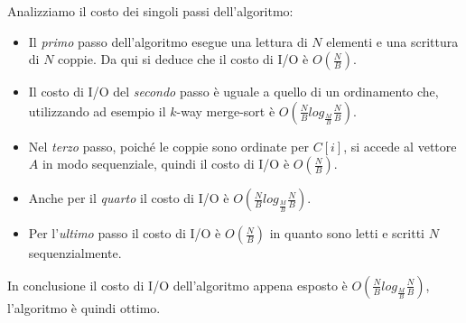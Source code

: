 Analizziamo il costo dei singoli passi dell'algoritmo:
\begin{itemize}
    \item Il \emph{primo} passo dell'algoritmo esegue una lettura di \(N\) elementi
    e una scrittura di \(N\) coppie. Da qui si deduce che il costo di I/O è
    \(O\left(\frac{N}{B}\right)\).
    \item Il costo di I/O del \emph{secondo} passo è uguale a quello di un
    ordinamento che, utilizzando ad esempio il \(k\)-way merge-sort è
    \(O\left(\frac{N}{B}log_\frac{M}{B} \frac{N}{B}\right)\).
    \item Nel \emph{terzo} passo, poiché le coppie sono ordinate per \(C[i]\), si accede
    al vettore \(A\) in modo sequenziale, quindi il costo di I/O è \(O\left(\frac{N}{B}\right)\).
    \item Anche per il \emph{quarto} il costo di I/O è
    \(O\left(\frac{N}{B}log_\frac{M}{B} \frac{N}{B}\right)\).
    \item Per l'\emph{ultimo} passo il costo di I/O è \(O\left(\frac{N}{B}\right)\) in quanto
    sono letti e scritti \(N\) sequenzialmente.
\end{itemize}

In conclusione il costo di I/O dell'algoritmo appena esposto è
\(O\left(\frac{N}{B}log_\frac{M}{B} \frac{N}{B}\right)\), l'algoritmo
è quindi ottimo.
